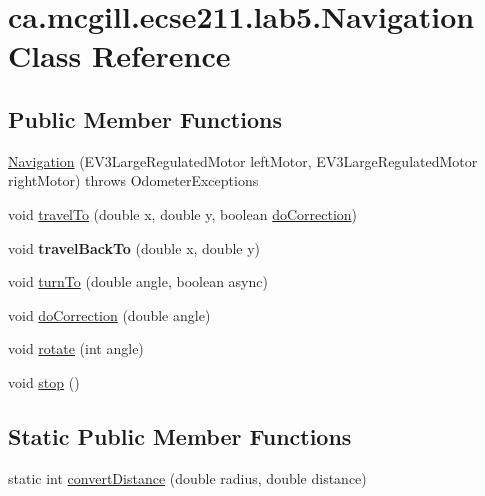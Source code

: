 \hypertarget{classca_1_1mcgill_1_1ecse211_1_1lab5_1_1_navigation}{}\section{ca.\+mcgill.\+ecse211.\+lab5.\+Navigation Class Reference}
\label{classca_1_1mcgill_1_1ecse211_1_1lab5_1_1_navigation}
\subsection*{Public Member Functions}
\begin{DoxyCompactItemize}
\item 
\hyperlink{classca_1_1mcgill_1_1ecse211_1_1lab5_1_1_navigation_a93b746f61226c3b14532c43d0c2f61dd}{Navigation} (E\+V3\+Large\+Regulated\+Motor left\+Motor, E\+V3\+Large\+Regulated\+Motor right\+Motor)  throws Odometer\+Exceptions 
\item 
void \hyperlink{classca_1_1mcgill_1_1ecse211_1_1lab5_1_1_navigation_a318969f4776d0bf4a8721be3d2444a5c}{travel\+To} (double x, double y, boolean \hyperlink{classca_1_1mcgill_1_1ecse211_1_1lab5_1_1_navigation_a73a89ddd822e0ba1cfd7a29c18aa7aea}{do\+Correction})
\item 
\mbox{\label{classca_1_1mcgill_1_1ecse211_1_1lab5_1_1_navigation_aacb83ee18419dcd6095e331975cf2167}} 
void {\bfseries travel\+Back\+To} (double x, double y)
\item 
void \hyperlink{classca_1_1mcgill_1_1ecse211_1_1lab5_1_1_navigation_a2b39928c8062fe6863de8e818d009e91}{turn\+To} (double angle, boolean async)
\item 
void \hyperlink{classca_1_1mcgill_1_1ecse211_1_1lab5_1_1_navigation_a73a89ddd822e0ba1cfd7a29c18aa7aea}{do\+Correction} (double angle)
\item 
void \hyperlink{classca_1_1mcgill_1_1ecse211_1_1lab5_1_1_navigation_a5fcce0063a6b557d349a6fb5bf144c64}{rotate} (int angle)
\item 
void \hyperlink{classca_1_1mcgill_1_1ecse211_1_1lab5_1_1_navigation_afe038af6692e7ad28c3587cd979d7223}{stop} ()
\end{DoxyCompactItemize}
\subsection*{Static Public Member Functions}
\begin{DoxyCompactItemize}
\item 
static int \hyperlink{classca_1_1mcgill_1_1ecse211_1_1lab5_1_1_navigation_a85122ad723d0988c118866f367073be6}{convert\+Distance} (double radius, double distance)
\end{DoxyCompactItemize}


